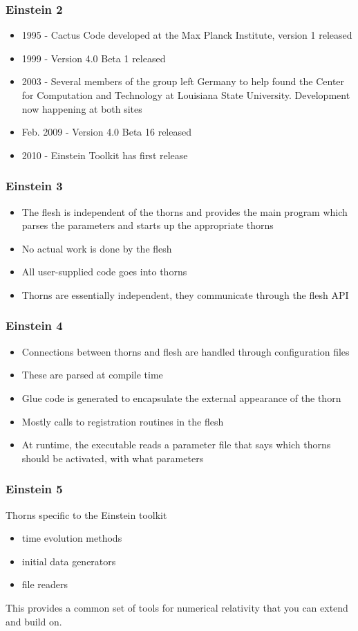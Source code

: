 \documentclass{beamer}
\begin{document}
\begin{frame}
  \frametitle{Einstein 2}
  \begin{itemize}
    \item 1995 - Cactus Code developed at the Max Planck Institute, version 1 released
    \item 1999 - Version 4.0 Beta 1 released
    \item 2003 - Several members of the group left Germany to help found the Center for Computation and Technology at Louisiana State University. Development now happening at both sites
    \item Feb. 2009 - Version 4.0 Beta 16 released
    \item 2010 - Einstein Toolkit has first release
  \end{itemize}
\end{frame}

\begin{frame}
  \frametitle{Einstein 3}
  \begin{itemize}
    \item The flesh is independent of the thorns and provides the main program which parses the parameters and starts up the appropriate thorns
    \item No actual work is done by the flesh
    \item All user-supplied code goes into thorns
    \item Thorns are essentially independent, they communicate through the flesh API
  \end{itemize}
\end{frame}

\begin{frame}
  \frametitle{Einstein 4}
  \begin{itemize}
    \item Connections between thorns and flesh are handled through configuration files
    \item These are parsed at compile time
    \item Glue code is generated to encapsulate the external appearance of the thorn
    \item Mostly calls to registration routines in the flesh
    \item At runtime, the executable reads a parameter file that says which thorns should be activated, with what parameters
  \end{itemize}
\end{frame}

\begin{frame}
  \frametitle{Einstein 5}
  Thorns specific to the Einstein toolkit
  \begin{itemize}
    \item time evolution methods
    \item initial data generators
    \item file readers
  \end{itemize}
  This provides a common set of tools for numerical relativity that you can extend and build on.
\end{frame}
\end{document}
